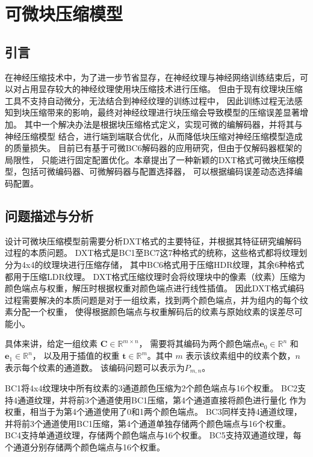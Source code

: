 
\chapter{可微块压缩模型}

\section{引言}

在神经压缩技术中，为了进一步节省显存，在神经纹理与神经网络训练结束后，可以对占用显存较大的神经纹理使用块压缩技术进行压缩。
但由于现有纹理块压缩工具不支持自动微分，无法结合到神经纹理的训练过程中，
因此训练过程无法感知到块压缩带来的影响，最终对神经纹理进行块压缩会导致模型的压缩误差显著增加。
其中一个解决办法是根据块压缩格式定义，实现可微的编解码器，并将其与神经压缩模型
结合，进行端到端联合优化，从而降低块压缩对神经压缩模型造成的质量损失。
目前已有基于可微BC6解码器的应用研究，但由于仅解码器框架的局限性，
只能进行固定配置优化。本章提出了一种新颖的DXT格式可微块压缩模型，包括可微编码器、可微解码器与配置选择器，
可以根据编码误差动态选择编码配置。

\section{问题描述与分析}
\label{问题描述}

设计可微块压缩模型前需要分析DXT格式的主要特征，并根据其特征研究编解码过程的本质问题。
DXT格式是BC1至BC7这7种格式的统称，这些格式都将纹理划分为4x4的纹理块进行压缩存储，
其中BC6格式用于压缩HDR纹理，其余6种格式都用于压缩LDR纹理。
DXT格式压缩纹理时会将纹理块中的像素（纹素）压缩为颜色端点与权重，解压时根据权重对颜色端点进行线性插值。
因此DXT格式编码过程需要解决的本质问题是对于一组纹素，找到两个颜色端点，并为组内的每个纹素分配一个权重，
使得根据颜色端点与权重解码后的纹素与原始纹素的误差尽可能小。

具体来讲，给定一组纹素 $\mathbf{C}\in\mathbb{R}^{m\times n}$，
需要将其编码为两个颜色端点$\mathbf{e}_0\in\mathbb{R}^n$ 和 $\mathbf{e}_1\in\mathbb{R}^n$，
以及用于插值的权重 $\mathbf{t}\in\mathbb{R}^m$。其中 $m$ 表示该纹素组中的纹素个数，$n$ 表示每个纹素的通道数。
该编码问题可以表示为$P_{m,n}$。

BC1将4x4纹理块中所有纹素的3通道颜色压缩为2个颜色端点与16个权重。
BC2支持4通道纹理，并将前3个通道使用BC1压缩，第4个通道直接将颜色进行量化
作为权重，相当于为第4个通道使用了0和1两个颜色端点。
BC3同样支持4通道纹理，并将前3个通道使用BC1压缩，第4个通道单独存储两个颜色端点与16个权重。
BC4支持单通道纹理，存储两个颜色端点与16个权重。
BC5支持双通道纹理，每个通道分别存储两个颜色端点与16个权重。

